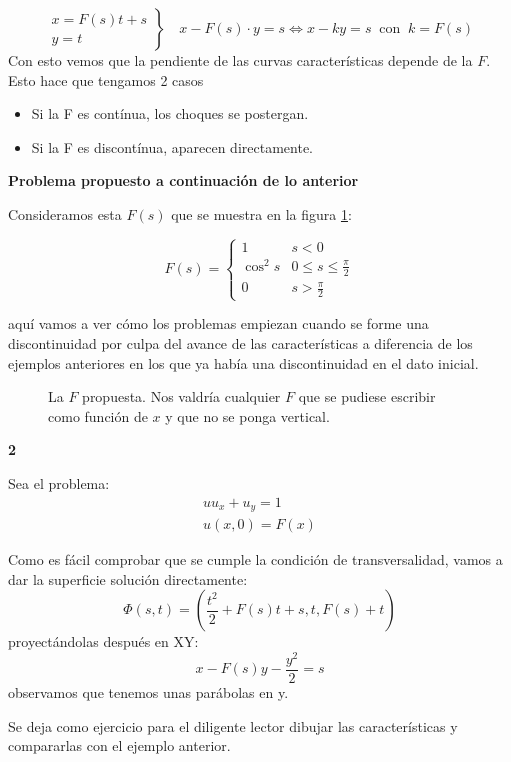 \begin{example}{1}
		\[
		\left.
		\begin{array}{r}
		x = F(s)t + s \\
		y = t
		\end{array}
		\right\} \quad x - F(s)\cdot y = s \iff x - ky = s \ \text{ con } \ k = F(s)
		\]
		Con esto vemos que la pendiente de las curvas características depende de la $F$. Esto hace que tengamos 2 casos
		\begin{itemize}
			\item Si la F es contínua, los choques se postergan.
			\item Si la F es discontínua, aparecen directamente.
		\end{itemize}


	\end{example}

	\textbf{Problema propuesto a continuación de lo anterior}

	Consideramos esta $F(s)$ que se muestra en la figura \ref{fig:Ejemplo-02-09-suave}:

	\[
	F(s) =
	\begin{cases}
	1 & s < 0 \\
	\cos^2 s & 0 \leq s \leq \frac{\pi}{2} \\
	0 & s > \frac{\pi}{2}
	\end{cases}
	\]

	aquí vamos a ver cómo los problemas empiezan cuando se forme una discontinuidad por culpa del avance de las características a diferencia de los ejemplos anteriores en los que ya había una discontinuidad en el dato inicial.

	\begin{figure}[hbtp]
		\centering
		\caption{La $F$ propuesta. Nos valdría cualquier $F$ que se pudiese escribir como función de $x$ y que no se ponga vertical.}
		\label{fig:Ejemplo-02-09-suave}
	\end{figure}

	\begin{example}{\bf 2}

		\noindent Sea el problema:
		\[
		\begin{array}{l}
			u u_x + u_y = 1 \\
			u(x,0) = F(x)
		\end{array}
		\]

		Como es fácil comprobar que se cumple la condición de transversalidad, vamos a dar la superficie solución directamente:
		\[ \Phi(s,t) = (\frac{t^2}{2} + F(s) t + s, t, F(s) + t) \] proyectándolas después en XY: \[ x - F(s)y - \frac{y^2}{2} = s \] observamos que tenemos unas parábolas en y.

		Se deja como ejercicio para el diligente lector dibujar las características y compararlas con el ejemplo anterior.

	\end{example}

